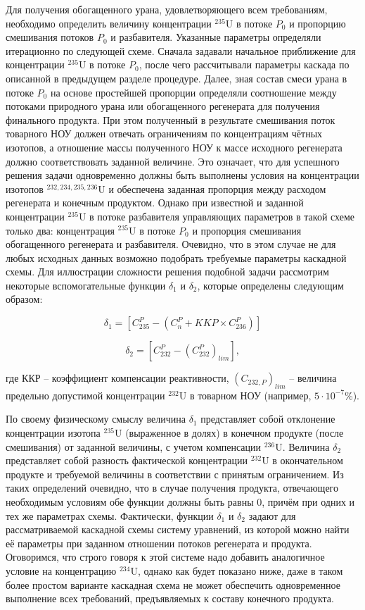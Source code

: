 Для получения обогащенного урана, удовлетворяющего всем требованиям, необходимо определить величину концентрации $^{235}$U в потоке $P_0$ и пропорцию смешивания потоков $P_0$ и разбавителя. Указанные параметры определяли итерационно по следующей схеме. Сначала задавали начальное приближение для концентрации $^{235}$U в потоке $P_0$, после чего рассчитывали параметры каскада по описанной в предыдущем разделе процедуре. Далее, зная состав смеси урана в потоке $P_0$ на основе простейшей пропорции определяли соотношение между потоками природного урана или обогащенного регенерата для получения финального продукта. При этом полученный в результате смешивания поток товарного НОУ должен отвечать ограничениям по концентрациям чётных изотопов, а отношение массы полученного НОУ к массе исходного регенерата должно соответствовать заданной величине. Это означает, что для успешного решения задачи одновременно должны быть выполнены условия на концентрации изотопов $^{232,234,235,236}$U и обеспечена заданная пропорция между расходом регенерата и конечным продуктом. Однако при известной и заданной концентрации $^{235}$U в потоке разбавителя управляющих параметров в такой схеме только два: концентрация $^{235}$U в потоке $P_0$ и пропорция смешивания обогащенного регенерата и разбавителя. Очевидно, что в этом случае не для любых исходных данных возможно подобрать требуемые параметры каскадной схемы. 
Для иллюстрации сложности решения подобной задачи рассмотрим некоторые вспомогательные функции $\delta_1$ и $\delta_2$, которые определены следующим образом:

\begin{equation} \label{d1} 
  \delta_1=\left[C_{235}^P-\left(C_n^P+KKP\times C_{236}^P\right)\right]
\end{equation} 

\begin{equation} \label{d2} 
    \delta_2=\left[C_{232}^P-{(C_{232}^P)}_{lim}\right],             
\end{equation}

где ККР -- коэффициент компенсации реактивности, $(C_{232,P})_{lim}$ -- величина предельно допустимой концентрации $^{232}$U в товарном НОУ (например, $5\cdot10^{-7}$\%).

По своему физическому смыслу величина $\delta_1$ представляет собой отклонение концентрации изотопа $^{235}$U (выраженное в долях) в конечном продукте (после смешивания) от заданной величины, с учетом компенсации $^{236}$U. Величина $\delta_2$ представляет собой разность фактической концентрации $^{232}$U в окончательном продукте и требуемой величины в соответствии с принятым ограничением. Из таких определений очевидно, что в случае получения продукта, отвечающего необходимым условиям обе функции должны быть равны 0, причём при одних и тех же параметрах схемы. Фактически, функции $\delta_1$ и $\delta_2$ задают для рассматриваемой каскадной схемы систему уравнений, из которой можно найти её параметры при заданном отношении потоков регенерата и продукта. Оговоримся, что строго говоря к этой системе надо добавить аналогичное условие на концентрацию $^{234}$U, однако как будет показано ниже, даже в таком более простом варианте каскадная схема не может обеспечить одновременное выполнение всех требований, предъявляемых к составу конечного продукта.   

